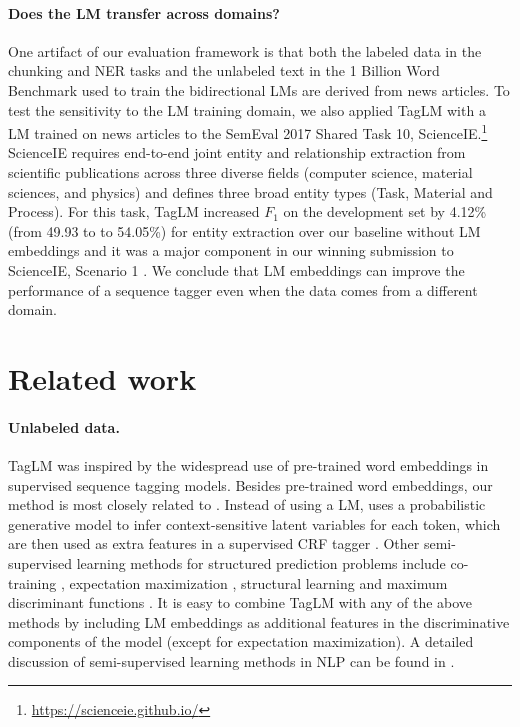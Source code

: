 \documentclass[11pt,a4paper]{article}
\begin{document}
\paragraph{Does the LM transfer across domains?}
One artifact of our evaluation framework is that both the labeled data in the chunking and NER tasks
and the unlabeled text in the 1 Billion Word Benchmark used to train the bidirectional LMs are derived from news articles.
To test the sensitivity to the LM training domain, we also applied TagLM with a LM trained on news articles
to the SemEval 2017 Shared Task 10, ScienceIE.\footnote{\url{https://scienceie.github.io/}}
ScienceIE requires end-to-end
joint entity and relationship extraction from scientific publications across three diverse fields (computer science, material sciences, and physics) and defines three broad entity types (Task, Material and Process).
For this task, TagLM increased $F_1$ on the development set by 4.12\% (from 49.93 to
to 54.05\%) for entity extraction over our baseline without LM embeddings and it was a major component
in our winning submission to ScienceIE, Scenario 1 \citep{scienceie}.
We conclude that LM embeddings can improve the performance of a sequence tagger even when the data comes from a different domain.

\section{Related work}

\paragraph{Unlabeled data.}
TagLM was inspired by the widespread use of pre-trained word embeddings in supervised sequence tagging models. 
Besides pre-trained word embeddings, our method is most closely related to \citet{li:05}.
Instead of using a LM, \citet{li:05} uses a probabilistic generative model to infer context-sensitive latent variables for each token, which are then used as extra features in a supervised CRF tagger \citep{CRF:Lafferty2001}.
Other semi-supervised learning methods for structured prediction problems include co-training \citep{blum:98,pierce:01}, expectation maximization \citep{nigam:00,mohit:05}, structural learning \citep{ando:05} and maximum discriminant functions \citep{suzuki:07,suzuki:08}.
It is easy to combine TagLM with any of the above methods by including LM embeddings as additional features in the discriminative components of the model (except for expectation maximization).
A detailed discussion of semi-supervised learning methods in NLP can be found in \cite{sogaard:13}.
\end{document}
